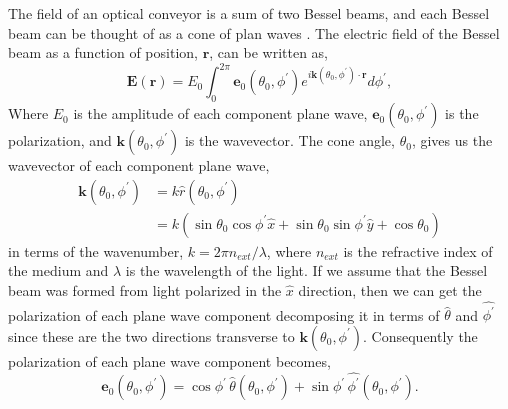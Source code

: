 \documentclass[aps,prl,twocolumn]{revtex4-1}
\newcommand{\pos}{\left(\mathbf{r} \right)}
\begin{document}
The field of an optical conveyor is
a sum of two Bessel beams, and each Bessel beam can be thought of as
a cone of plan waves \cite{cizmar_sub-micron_2006}. The electric
field of the Bessel beam as a function of position, $\mathbf{r}$, 
can be written as,
\begin{equation}
  \label{eq:besselfield}
  \mathbf{E}\pos =  E_0 \int_0^{2\pi} \mathbf{e}_0(\theta_0,\phi^\prime) 
      e^{i \mathbf{k}(\theta_0,\phi^\prime) \cdot \mathbf{r} } d\phi^\prime,
\end{equation}
Where $E_0$ is the amplitude of each component plane wave, 
$\mathbf{e}_0(\theta_0,\phi^\prime)$ is the polarization, and 
$\mathbf{k}(\theta_0,\phi^\prime)$ is the wavevector. The cone angle, $\theta_0$,
gives us the wavevector of each component plane wave,
\begin{align}
  \label{eq:wavevector}
  \mathbf{k}(\theta_0,\phi^\prime) &= k \hat{r}(\theta_0,\phi^\prime) \\
  &= k(\sin\theta_0 \cos \phi^\prime \hat{x} +
       \sin\theta_0 \sin \phi^\prime \hat{y} +
       \cos\theta_0) 
\end{align}
 in terms of the wavenumber, $k = 2 \pi n_{ext}/\lambda$, where $n_{ext}$ is the
refractive index of the medium and $\lambda$ is the wavelength of the 
light. If we assume that the Bessel beam was formed from light polarized 
in the $\hat{x}$ direction, then we can get the polarization of 
each plane wave component decomposing it in terms of $\hat{\theta}$
and $\hat{\phi^\prime}$ since these are the two directions transverse to 
$\mathbf{k}(\theta_0,\phi^\prime)$. Consequently the polarization of 
each plane wave component becomes,
\begin{equation}
  \label{eq:polarization}
  \mathbf{e}_0(\theta_0,\phi^\prime) = \cos \phi^\prime \,\hat{\theta}(\theta_0,\phi^\prime)
                               +\sin \phi^\prime\, \hat{\phi^\prime}(\theta_0,\phi^\prime).
\end{equation}
\end{document}
